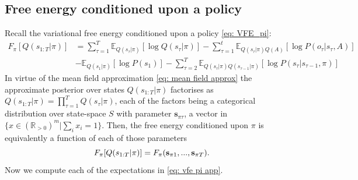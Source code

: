 \documentclass[review,12pt,authoryear]{elsarticle}
\newcommand{\R}{\mathbb R}
\newcommand{\E}{\mathbb E}
\begin{document}
\subsection{Free energy conditioned upon a policy}
Recall the variational free energy conditioned upon a policy \eqref{eq: VFE_pi}:
\begin{equation}
\label{eq: vfe pi app}
  	    \begin{split}
  	        F_\pi[Q(s_{1:T}|\pi)] & = \sum_{\tau =1}^T\E_{Q(s_\tau |\pi)}[\log Q(s_\tau |\pi)] -\sum_{\tau = 1}^t \E_{Q(s_\tau |\pi)Q(A)}[\log P(o_{\tau}|s_{\tau},A)] \\
  	        &-\E_{Q(s_1 |\pi)}[\log P(s_1)]-\sum_{\tau =2}^T \E_{Q(s_\tau |\pi)Q(s_{\tau-1} |\pi)}[\log P(s_\tau |s_{\tau-1},\pi)]
      	    \end{split}
  \end{equation}
In virtue of the mean field approximation \eqref{eq: mean field approx} the approximate posterior over states $Q(s_{1:T}|\pi)$ factorises as $Q(s_{1:T}|\pi)= \prod_{\tau=1}^T Q(s_\tau|\pi)$, each of the factors being a categorical distribution over state-space $S$ with parameter $\mathbf s_{\pi \tau}$, a vector in $\{x \in (\R_{>0})^m | \sum_{i}x_i=1\}$. Then, the free energy conditioned upon $\pi$ is equivalently a function of each of those parameters
\begin{equation*}
    F_\pi[Q(s_{1:T}|\pi)] = F_\pi(\bold s_{\pi 1},...,\bold s_{\pi T}).
\end{equation*}
Now we compute each of the expectations in \eqref{eq: vfe pi app}.
\end{document}
